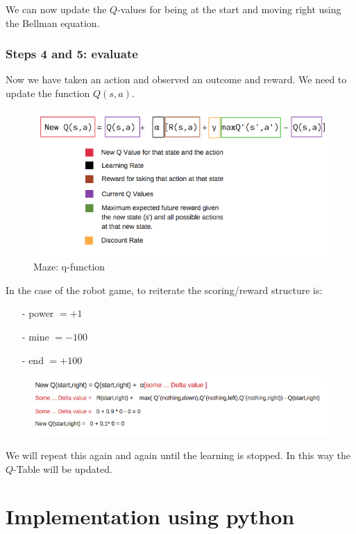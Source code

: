 We can now update the $Q$-values for being at the start and moving right using the 
Bellman equation.


\subsubsection{Steps 4 and 5: evaluate}

Now we have taken an action and observed an outcome and reward. We need to update 
the function $Q(s,a)$.

\begin{figure}[!htb]
\centering
\includegraphics[scale=0.5]{pix/q_learning/q_robot_maze_q_function.png}
\caption{Maze: q-function}
\end{figure}

In the case of the robot game, to reiterate the scoring/reward structure is:

\begin{itemize}
\setlength{\parskip}{0pt}
\item[-]
power $= +1$
\item[-]
mine $= -100$
\item[-]
end $= +100$
\end{itemize}

\begin{figure}[!htb]
\centering
\includegraphics[scale=0.7]{pix/q_learning/q_robot_maze_iteration.png}
\end{figure}
We will repeat this again and again until the learning is stopped. In this way 
the $Q$-Table will be updated.


\section{Implementation using python}


